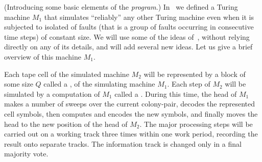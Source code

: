 \documentclass[11pt]{memoir}
\theoremstyle{definition} %
\newcommand{\Q}{Q} %
\begin{document}
(Introducing some basic elements of the \emph{program}.)
In~\cite{burstyTuring13} we defined a Turing machine \( M_{1} \) that simulates ``reliably'' any other
Turing machine even when it is subjected to isolated  of faults (that is a group
of faults occurring in consecutive time steps) of constant size.
We will use some of the ideas of~\cite{burstyTuring13}, without relying directly
on any of its details, and will add several new ideas.
Let us give a brief overview of this machine \( M_{1} \).

Each tape cell of the simulated machine \( M_{2} \) will be represented by a block of
some size \( \Q \) called a , of the simulating machine \( M_{1} \).
Each step of \( M_{2} \) will be simulated by a computation of \( M_{1} \) called
a .
During this time, the head of \( M_{1} \) makes a number of sweeps over the
current colony-pair, decodes the represented cell symbols,
then computes and encodes the new symbols, and finally moves the head 
to the new position of the head of \( M_{2} \).
The major processing steps will be 
carried out on a working track three times within one work period,
recording the result onto separate tracks.
The information track is changed only in a final majority vote.
\end{document}
